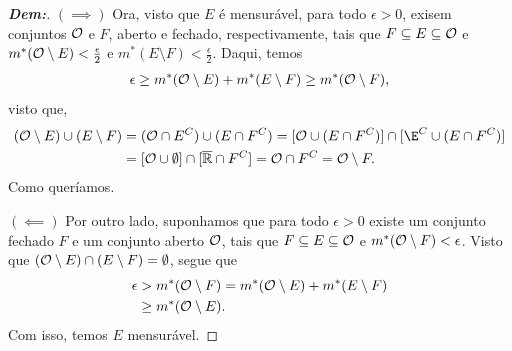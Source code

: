 \bigline
\begin{proof}[\textbf{Dem:}]
  \hfill 
  
  \noindent 
  $(\implies)$ Ora, visto que $E$ é mensurável, para todo $\epsilon > 0$, exisem conjuntos 
  $\mathcal O$ e $F$, aberto e fechado, respectivamente, tais que 
  $F\subseteq E \subseteq \mathcal O$ e $m^*(\mathcal O\setminus E) < \frac{\epsilon}{2}$
  e $m^*(E\setminus F) < \frac{\epsilon}{2}$. Daqui, temos
  \begin{align*}
    \epsilon \ge m^*(\mathcal O\setminus E) + m^*(E\setminus F) \ge m^*(\mathcal O \setminus F), 
  \end{align*}
  visto que, 
  \begin{align*}
    (\mcal O \setminus E) \cup (E \setminus F) &= 
    (\mcal O \cap E^C) \cup (E \cap F^C) = [\mcal O \cup (E \cap F^C)] \cap [\E^C \cup 
    (E \cap F^C)]\\ 
    &= [\mcal O\cup \emptyset] \cap [\xbR \cap F^C]
    = \mcal O \cap F^C = \mcal O \setminus F.
  \end{align*}
  Como queríamos.

  \noindent 
  $(\impliedby)$ Por outro lado, suponhamos que para todo $\epsilon>0$ existe 
  um conjunto fechado $F$ e um conjunto aberto $\mathcal O$, tais que 
  $F \subseteq E \subseteq \mathcal O$ e $m^*(\mathcal O\setminus F) < \epsilon$.
  Visto que $(\mathcal O\setminus E) \cap (E\setminus F) = \emptyset$, segue que 
  \begin{align*}
    \epsilon &> m^*(\mathcal O\setminus F) = m^*(\mathcal O \setminus E) + m^*(E \setminus F)\\
    &\ge m^*(\mathcal O\setminus E).
  \end{align*}
  Com isso, temos $E$ mensurável.
\end{proof}
\biglinend
\newpage
{}
\myexe{\thedois}
\bigline 

